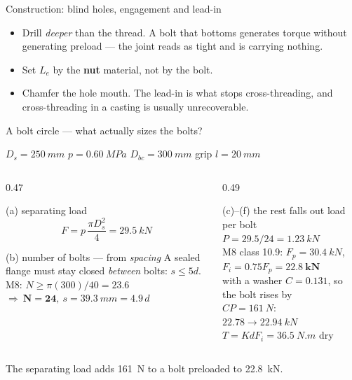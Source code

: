 \documentclass[aspectratio=169,10pt]{beamer}
\begin{document}
\begin{frame}{Construction: blind holes, engagement and lead-in}
\centering
\resizebox{0.92\textwidth}{!}{}
\vfill
\raggedright
\begin{itemize}
  \item Drill \emph{deeper} than the thread. A bolt that bottoms generates torque without generating
        preload --- the joint reads as tight and is carrying nothing.
  \item Set $L_e$ by the \textbf{nut} material, not by the bolt.
  \item Chamfer the hole mouth. The lead-in is what stops cross-threading, and cross-threading in a
        casting is usually unrecoverable.
\end{itemize}
\end{frame}

\begin{frame}{A bolt circle --- what actually sizes the bolts?}
\begin{center}\small
$D_s=\SI{250}{mm}$ \quad $p=\SI{0.60}{MPa}$ \quad $D_{bc}=\SI{300}{mm}$ \quad grip $l=\SI{20}{mm}$
\end{center}
\vspace{-4pt}
\begin{columns}[T]
\begin{column}{0.47\textwidth}
\begin{block}{\small (a) separating load}
\small
\[ F = p\,\frac{\pi D_s^2}{4} = \SI{29.5}{kN} \]
\end{block}
\begin{block}{\small (b) number of bolts --- from \emph{spacing}}
\small
A sealed flange must stay closed \emph{between} bolts: $s\le 5d$.\\[2pt]
M8: $N \ge \pi(300)/40 = 23.6$\\[2pt]
\centering $\Rightarrow\ \mathbf{N=24}, \ s=\SI{39.3}{mm}=4.9\,d$
\end{block}
\end{column}
\begin{column}{0.49\textwidth}
\begin{block}{\small (c)--(f) the rest falls out}
\small
load per bolt \ $P = 29.5/24 = \SI{1.23}{kN}$\\[3pt]
M8 class 10.9: $F_p=\SI{30.4}{kN}$, $F_i=0.75F_p=\mathbf{\SI{22.8}{kN}}$\\[3pt]
with a washer $C=0.131$, so the bolt rises by\\
$CP=\SI{161}{N}$: \ $22.78 \to \SI{22.94}{kN}$\\[3pt]
$T = K d F_i = \SI{36.5}{N.m}$ dry
\end{block}
\end{column}
\end{columns}
\vspace{2pt}
\centering\alert{\small The separating load adds \SI{161}{N} to a bolt preloaded to \SI{22.8}{kN}.}
\end{frame}
\end{document}
